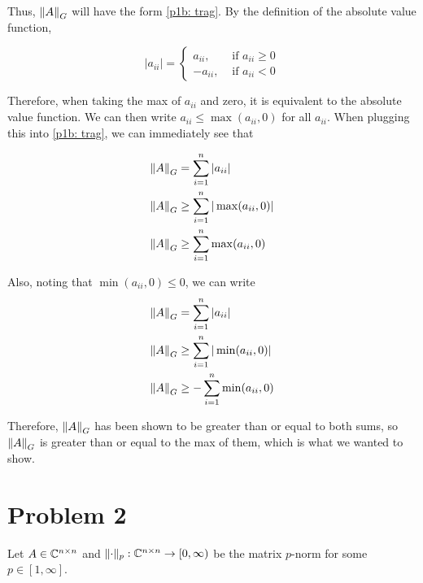 \begin{solution}
    Thus, $\norm{A}_G$ will have the form \ref{p1b: trag}. By the definition of the absolute value function,

    \[
    |a_{ii}| = 
    \begin{cases}
     a_{ii}, &\text{ if } a_{ii} \geq 0 \\
    -a_{ii}, &\text{ if } a_{ii} < 0
    \end{cases}
    \]

    Therefore, when taking the max of $a_{ii}$ and zero, it is equivalent to the absolute value function. We can then write $a_{ii} \leq \max(a_{ii}, 0)$ for all $a_{ii}$. When plugging this into \ref{p1b: trag}, we can immediately see that 

    \begin{align}
        \norm{A}_G &= \sum_{i = 1}^n |a_{ii}|\nonumber\\
        \norm{A}_G &\geq \sum_{i = 1}^n |\max(a_{ii}, 0)|\nonumber\\
        \norm{A}_G &\geq \sum_{i = 1}^n \max(a_{ii}, 0)\nonumber
    \end{align}

    Also, noting that $\min(a_{ii}, 0) \leq 0$, we can write
        \begin{align}
        \norm{A}_G &= \sum_{i = 1}^n |a_{ii}|\nonumber\\
        \norm{A}_G &\geq \sum_{i = 1}^n |\min(a_{ii}, 0)|\nonumber\\
        \norm{A}_G &\geq -\sum_{i = 1}^n \min(a_{ii}, 0)\nonumber
    \end{align}

    Therefore, $\norm{A}_G$ has been shown to be greater than or equal to both sums, so $\norm{A}_G$ is greater than or equal to the max of them, which is what we wanted to show. 
\end{solution}
\newpage
\section{Problem 2}
Let $A \in \mathbb{C}^{n\times n}$ and $\lVert \cdot \rVert_p : \mathbb{C}^{n \times n} \rightarrow [0, \infty )$ be the matrix $p$-norm for some $p \in [1, \infty]$. 

